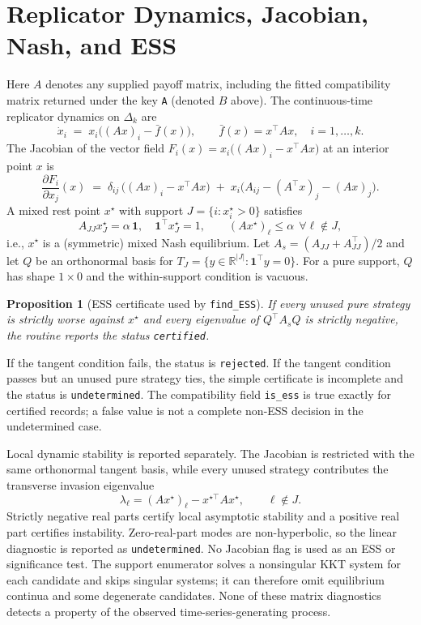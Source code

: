 \documentclass[11pt]{article}
\newtheorem{proposition}{Proposition}
\newcommand{\one}{\mathbf{1}}
\newcommand{\R}{\mathbb{R}}
\begin{document}
\section{Replicator Dynamics, Jacobian, Nash, and ESS}
Here $A$ denotes any supplied payoff matrix, including the fitted compatibility
matrix returned under the key \texttt{A} (denoted $B$ above).
The continuous-time replicator dynamics on $\Delta_k$ are
\begin{equation}
\dot x_i \;=\; x_i \Big((Ax)_i - \bar f(x)\Big),\qquad \bar f(x)=x^\top A x,\quad i=1,\dots,k.
\end{equation}
The Jacobian of the vector field $F_i(x)=x_i\big((Ax)_i - x^\top A x\big)$ at an interior point $x$ is
\begin{equation}
\frac{\partial F_i}{\partial x_j}(x) \;=\; \delta_{ij}\,\big((Ax)_i - x^\top A x\big) \;+\; x_i\Big(A_{ij} - (A^\top x)_j - (Ax)_j\Big).
\end{equation}
A mixed rest point $x^\star$ with support $J=\{i:x^\star_i>0\}$ satisfies
\begin{equation}
A_{JJ} x^\star_J = \alpha\,\one,\quad \one^\top x^\star_J=1,\qquad (Ax^\star)_\ell \le \alpha\ \ \forall \ell\notin J,
\end{equation}
i.e., $x^\star$ is a (symmetric) mixed Nash equilibrium. Let
\(
A_s=(A_{JJ}+A_{JJ}^\top)/2
\)
and let $Q$ be an orthonormal basis for
\(
T_J=\{y\in\R^{|J|}:\one^\top y=0\}.
\)
For a pure support, $Q$ has shape $1\times0$ and the within-support condition is vacuous.
\begin{proposition}[ESS certificate used by \texttt{find\_ESS}]
If every unused pure strategy is strictly worse against $x^\star$ and every
eigenvalue of $Q^\top A_sQ$ is strictly negative, the routine reports the status
\texttt{certified}.
\end{proposition}
If the tangent condition fails, the status is \texttt{rejected}. If the tangent condition passes but an unused pure strategy ties, the simple certificate is incomplete and the status is \texttt{undetermined}. The compatibility field \texttt{is\_ess} is true exactly for certified records; a false value is not a complete non-ESS decision in the undetermined case.

Local dynamic stability is reported separately. The Jacobian is restricted with the same orthonormal tangent basis, while every unused strategy contributes the transverse invasion eigenvalue
\begin{equation}
\lambda_\ell=(Ax^\star)_\ell-x^{\star\top}Ax^\star,\qquad \ell\notin J.
\end{equation}
Strictly negative real parts certify local asymptotic stability and a positive real part certifies instability. Zero-real-part modes are non-hyperbolic, so the linear diagnostic is reported as \texttt{undetermined}. No Jacobian flag is used as an ESS or significance test. The support enumerator solves a nonsingular KKT system for each candidate and skips singular systems; it can therefore omit equilibrium continua and some degenerate candidates. None of these matrix diagnostics detects a property of the observed time-series-generating process.
\end{document}
